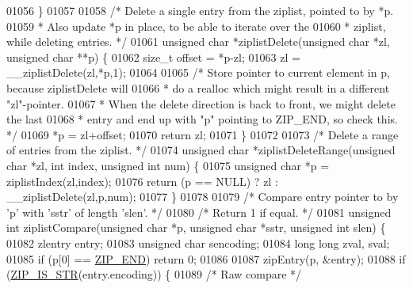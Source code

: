 \begin{DoxyCode}
{{01056 \}
01057 
01058 \textcolor{comment}{/* Delete a single entry from the ziplist, pointed to by *p.}
01059 \textcolor{comment}{ * Also update *p in place, to be able to iterate over the}
01060 \textcolor{comment}{ * ziplist, while deleting entries. */}
01061 \textcolor{keywordtype}{unsigned} \textcolor{keywordtype}{char} *ziplistDelete(\textcolor{keywordtype}{unsigned} \textcolor{keywordtype}{char} *zl, \textcolor{keywordtype}{unsigned} \textcolor{keywordtype}{char} **p) \{
01062     size\_t offset = *p-zl;
01063     zl = \_\_ziplistDelete(zl,*p,1);
01064 
01065     \textcolor{comment}{/* Store pointer to current element in p, because ziplistDelete will}
01066 \textcolor{comment}{     * do a realloc which might result in a different "zl"-pointer.}
01067 \textcolor{comment}{     * When the delete direction is back to front, we might delete the last}
01068 \textcolor{comment}{     * entry and end up with "p" pointing to ZIP\_END, so check this. */}
01069     *p = zl+offset;
01070     \textcolor{keywordflow}{return} zl;
01071 \}
01072 
01073 \textcolor{comment}{/* Delete a range of entries from the ziplist. */}
01074 \textcolor{keywordtype}{unsigned} \textcolor{keywordtype}{char} *ziplistDeleteRange(\textcolor{keywordtype}{unsigned} \textcolor{keywordtype}{char} *zl, \textcolor{keywordtype}{int} index, \textcolor{keywordtype}{unsigned} \textcolor{keywordtype}{int} num) \{
01075     \textcolor{keywordtype}{unsigned} \textcolor{keywordtype}{char} *p = ziplistIndex(zl,index);
01076     \textcolor{keywordflow}{return} (p == NULL) ? zl : \_\_ziplistDelete(zl,p,num);
01077 \}
01078 
01079 \textcolor{comment}{/* Compare entry pointer to by 'p' with 'sstr' of length 'slen'. */}
01080 \textcolor{comment}{/* Return 1 if equal. */}
01081 \textcolor{keywordtype}{unsigned} \textcolor{keywordtype}{int} ziplistCompare(\textcolor{keywordtype}{unsigned} \textcolor{keywordtype}{char} *p, \textcolor{keywordtype}{unsigned} \textcolor{keywordtype}{char} *sstr, \textcolor{keywordtype}{unsigned} \textcolor{keywordtype}{int} slen) \{
01082     zlentry entry;
01083     \textcolor{keywordtype}{unsigned} \textcolor{keywordtype}{char} sencoding;
01084     \textcolor{keywordtype}{long} \textcolor{keywordtype}{long} zval, sval;
01085     \textcolor{keywordflow}{if} (p[0] == \hyperlink{ziplist_8c_a31a8f9d5b5bad75318741cfca5de5ea8}{ZIP\_END}) \textcolor{keywordflow}{return} 0;
01086 
01087     zipEntry(p, &entry);
01088     \textcolor{keywordflow}{if} (\hyperlink{ziplist_8c_a2cb79e478d5bda74592c92230cfd6761}{ZIP\_IS\_STR}(entry.encoding)) \{
01089         \textcolor{comment}{/* Raw compare */}
}}
\end{DoxyCode}
